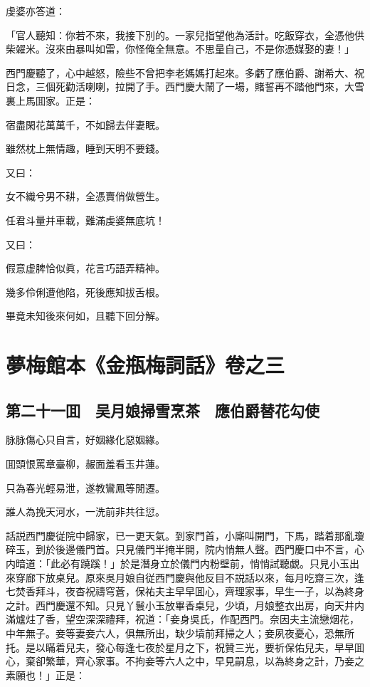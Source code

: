 虔婆亦答道：

「官人聽知：你若不來，我接下別的。一家兒指望他為活計。吃飯穿衣，全憑他供柴糴米。沒來由暴叫如雷，你怪俺全無意。不思量自己，不是你憑媒娶的妻！」

西門慶聽了，心中越怒，險些不曾把李老媽媽打起來。多虧了應伯爵、謝希大、祝日念，三個死勸活喇喇，拉開了手。西門慶大鬧了一場，賭誓再不踏他門來，大雪裏上馬囬家。正是：

宿盡閑花萬萬千，不如歸去伴妻眠。

雖然枕上無情趣，睡到天明不要錢。

又曰：

女不織兮男不耕，全憑賣俏做營生。

任君斗量并車載，難滿虔婆無底坑！

又曰：

假意虚脾恰似眞，花言巧語弄精神。

幾多伶俐遭他陷，死後應知拔舌根。

畢竟未知後來何如，且聽下回分解。

\part*{夢梅館本《金瓶梅詞話》卷之三}

\chapter*{第二十一囬　吴月娘掃雪烹茶　應伯爵替花勾使}

脉脉傷心只自言，好姻緣化惡姻緣。

囬頭恨罵章臺柳，赧面羞看玉井蓮。

只為春光輕易泄，遂教鸞鳳等閒遷。

誰人為挽天河水，一洗前非共往愆。

話説西門慶従院中歸家，已一更天氣。到家門首，小廝叫開門，下馬，踏着那亂瓊碎玉，到於後邊儀門首。只見儀門半掩半開，院内悄無人聲。西門慶口中不言，心内暗道：「此必有蹺蹊！」於是潛身立於儀門内粉壁前，悄悄試聽覷。只見小玉出來穿廊下放桌兒。原來吳月娘自従西門慶與他反目不説話以來，每月吃齋三次，逢七焚香拜斗，夜杳祝禱穹蒼，保祐夫主早早囬心，齊理家事，早生一子，以為終身之計。西門慶還不知。只見丫鬟小玉放畢香桌兒，少頃，月娘整衣出房，向天井内滿爐炷了香，望空深深禮拜，祝道：「妾身吳氏，作配西門。奈因夫主流戀烟花，中年無子。妾等妻妾六人，俱無所出，缺少墳前拜掃之人；妾夙夜憂心，恐無所托。是以瞞着兒夫，發心每逢七夜於星月之下，祝贊三光，要祈保佑兒夫，早早囬心，棄卻繁華，齊心家事。不拘妾等六人之中，早見嗣息，以為終身之計，乃妾之素願也！」正是：

